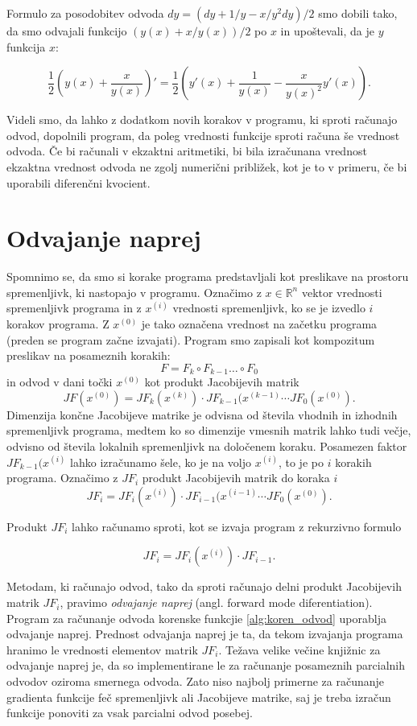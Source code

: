\documentclass[12pt,slovene]{article}
\begin{document}
Formulo za posodobitev odvoda $dy = (dy + 1/y - x/y^2dy)/2$ smo dobili tako, da smo odvajali funkcijo $(y(x) + x/y(x))/2$ po $x$ in upoštevali, da je $y$ funkcija $x$:

$$
\frac{1}{2}\left(y(x) + \frac{x}{y(x)}\right)' = \frac{1}{2}\left(y'(x) + \frac{1}{y(x)} -\frac{x}{y(x)^2}y'(x)\right).
$$

Videli smo, da lahko z dodatkom novih korakov v programu, ki sproti računajo odvod, dopolnili
program, da poleg vrednosti funkcije sproti računa še vrednost odvoda. Če bi računali v ekzaktni aritmetiki, bi bila izračunana vrednost ekzaktna vrednost odvoda ne zgolj numerični približek, kot je to v primeru, če bi uporabili diferenčni kvocient. 

\section{Odvajanje naprej}

Spomnimo se, da smo si korake programa predstavljali kot preslikave na prostoru spremenljivk, ki nastopajo v programu. Označimo z $x\in\mathbb{R}^n$ vektor vrednosti spremenljivk programa in z $x^{(i)}$ vrednosti spremenljivk, ko se je izvedlo $i$ korakov programa. Z $x^{(0)}$ je tako označena vrednost na začetku programa (preden se program začne izvajati). Program smo zapisali kot kompozitum preslikav na posameznih korakih:
$$
F = F_k\circ F_{k-1}\ldots\circ F_0
$$
in odvod v dani točki $x^{(0)}$ kot produkt Jacobijevih matrik
$$
JF(x^{(0)}) = JF_k(x^{(k)})\cdot JF_{k-1}(x^{(k-1)}\cdots JF_0(x^{(0)}).
$$
Dimenzija končne Jacobijeve matrike je odvisna od števila vhodnih in izhodnih spremenljivk programa, medtem ko so dimenzije vmesnih matrik lahko tudi večje, odvisno od števila lokalnih spremenljivk na določenem koraku. Posamezen faktor $JF_{k-1}(x^{(i)}$ lahko izračunamo šele, ko je na voljo  $x^{(i)}$, to je po $i$ korakih programa. Označimo z $JF_i$ produkt Jacobijevih matrik do koraka $i$ 
$$
JF_i = JF_i(x^{(i)})\cdot JF_{i-1}(x^{(i-1)}\cdots JF_0(x^{(0)}).
$$

Produkt $JF_i$ lahko računamo sproti, kot se izvaja program z rekurzivno formulo

$$
JF_{i} = JF_i(x^{(i)})\cdot JF_{i-1}.
$$

Metodam, ki računajo odvod, tako da sproti računajo delni produkt Jacobijevih matrik $JF_i$, pravimo \emph{odvajanje naprej} (angl. forward mode diferentiation). Program za računanje odvoda korenske funkcjie \ref{alg:koren_odvod} uporablja odvajanje naprej. Prednost odvajanja 
naprej je ta, da tekom izvajanja programa hranimo le vrednosti elementov matrik $JF_i$. Težava velike večine knjižnic za odvajanje naprej je, da so implementirane le za računanje posameznih parcialnih odvodov oziroma smernega odvoda. Zato niso najbolj primerne za računanje gradienta funkcije feč spremenljivk ali Jacobijeve matrike, saj je treba izračun funkcije ponoviti za vsak parcialni odvod posebej.
\end{document}

